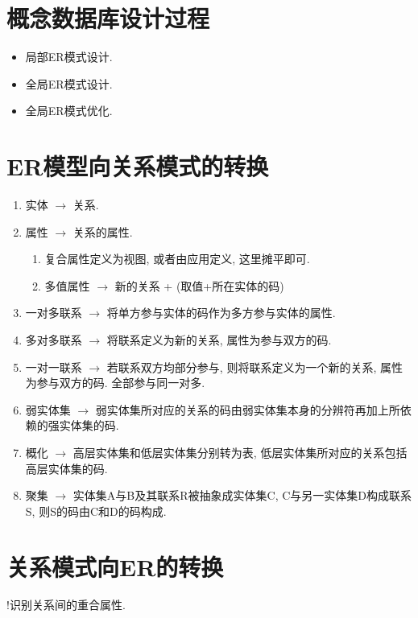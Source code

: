 \section{概念数据库设计过程}

\begin{itemize}
    \item 局部ER模式设计.
    \item 全局ER模式设计.
    \item 全局ER模式优化.
\end{itemize}

\section{ER模型向关系模式的转换}

\begin{enumerate}
    \item 实体 $\to$ 关系.
    \item 属性 $\to$ 关系的属性.
    \begin{enumerate}
        \item 复合属性定义为视图, 或者由应用定义, 这里摊平即可.
        \item 多值属性 $\to$ 新的关系 + (取值+所在实体的码)
    \end{enumerate}
    \item 一对多联系 $\to$ 将单方参与实体的码作为多方参与实体的属性.
    \item 多对多联系 $\to$ 将联系定义为新的关系, 属性为参与双方的码.
    \item 一对一联系 $\to$ 若联系双方均部分参与, 则将联系定义为一个新的关系, 属性为参与双方的码. 全部参与同一对多.
    \item 弱实体集 $\to$ 弱实体集所对应的关系的码由弱实体集本身的分辨符再加上所依赖的强实体集的码.
    \item 概化 $\to$ 高层实体集和低层实体集分别转为表, 低层实体集所对应的关系包括高层实体集的码.
    \item 聚集 $\to$ 实体集A与B及其联系R被抽象成实体集C, C与另一实体集D构成联系S, 则S的码由C和D的码构成.
\end{enumerate}

\section{关系模式向ER的转换}

!识别关系间的重合属性.


